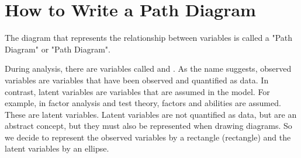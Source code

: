 \documentclass{ltjsbook}
\begin{document}
\section{How to Write a Path Diagram}
The diagram that represents the relationship between variables is called a "Path Diagram" or "Path Diagram".

During analysis, there are variables called  and . As the name suggests, observed variables are variables that have been observed and quantified as data. In contrast, latent variables are variables that are assumed in the model. For example, in factor analysis and test theory, factors and abilities are assumed. These are latent variables. Latent variables are not quantified as data, but are an abstract concept, but they must also be represented when drawing diagrams.
So we decide to represent the observed variables by a rectangle (rectangle) and the latent variables by an ellipse.
\end{document}
